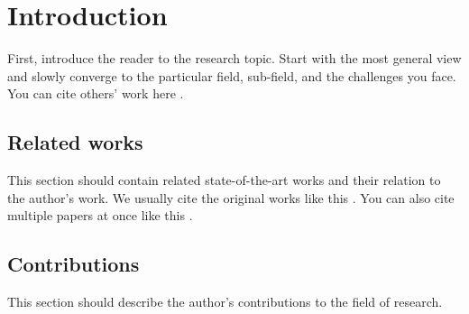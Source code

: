 
\chapter{Introduction\label{chap:introduction}}

First, introduce the reader to the research topic.
Start with the most general view and slowly converge to the particular field, sub-field, and the challenges you face.
You can cite others' work here \cite{baca2021mrs}.

\section{Related works}

This section should contain related state-of-the-art works and their relation to the author's work.
We usually cite the original works like this \cite{benallegue2008high}.
You can also cite multiple papers at once like this \cite{baca2016embedded, baca2021mrs}.

\section{Contributions}

This section should describe the author's contributions to the field of research.
